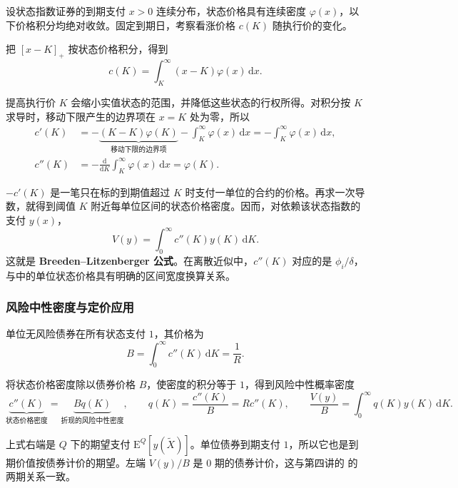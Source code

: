 \begin{tcolorbox}[knowledge,title=连续模型的条件]
设状态指数证券的到期支付 $x>0$ 连续分布，状态价格具有连续密度 $\varphi(x)$，以下价格积分均绝对收敛。固定到期日，考察看涨价格 $c(K)$ 随执行价的变化。
\end{tcolorbox}
把 $[x-K]_+$ 按状态价格积分，得到
\[
 c(K)=\int_K^\infty(x-K)\varphi(x)\,\mathrm dx.
\]
\begin{tcolorbox}[knowledge,title=状态价格密度与 Breeden--Litzenberger 公式]
提高执行价 $K$ 会缩小实值状态的范围，并降低这些状态的行权所得。对积分按 $K$ 求导时，移动下限产生的边界项在 $x=K$ 处为零，所以
\[
 \begin{aligned}
 c'(K)&=-\underbrace{(K-K)\varphi(K)}_{\text{移动下限的边界项}}
         -\int_K^\infty\varphi(x)\,\mathrm dx
        =-\int_K^\infty\varphi(x)\,\mathrm dx,\\
 c''(K)&=-\frac{\mathrm d}{\mathrm dK}\int_K^\infty\varphi(x)\,\mathrm dx
        =\varphi(K).
 \end{aligned}
\]

$-c'(K)$ 是一笔只在标的到期值超过 $K$ 时支付一单位的合约的价格。再求一次导数，就得到阈值 $K$ 附近每单位区间的状态价格密度。因而，对依赖该状态指数的支付 $y(x)$，
\begin{equation}
 V(y)=\int_0^\infty c''(K)y(K)\,\mathrm dK.
 \label{eq:wj-five-bl}
\end{equation}
这就是 \textbf{Breeden--Litzenberger 公式}。在离散近似中，$c''(K)$ 对应的是 $\phi_i/\delta$，与中的单位状态价格具有明确的区间宽度换算关系。
\end{tcolorbox}

\subsubsection{风险中性密度与定价应用}
单位无风险债券在所有状态支付 $1$，其价格为
\[
 B=\int_0^\infty c''(K)\,\mathrm dK=\frac1R.
\]
\begin{tcolorbox}[knowledge,title=风险中性密度与定价]
将状态价格密度除以债券价格 $B$，使密度的积分等于 $1$，得到风险中性概率密度
\begin{equation}
 \underbrace{c''(K)}_{\text{状态价格密度}}
 =\underbrace{Bq(K)}_{\text{折现的风险中性密度}},\qquad
 q(K)=\frac{c''(K)}B=R c''(K),\qquad
 \frac{V(y)}B=\int_0^\infty q(K)y(K)\,\mathrm dK.
 \label{eq:wj-five-density}
\end{equation}
\end{tcolorbox}
上式右端是 $Q$ 下的期望支付 $\mathrm E^Q[y(\tilde X)]$。单位债券到期支付 $1$，所以它也是到期价值按债券计价的期望。左端 $V(y)/B$ 是 0 期的债券计价，这与第四讲的 的两期关系一致。

